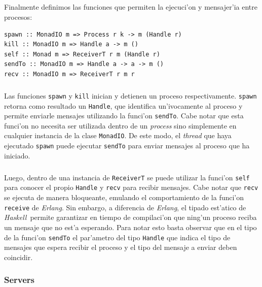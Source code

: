 \documentclass[a4paper]{article}
\newcommand{\haskell}{\textsl{Haskell}}
\begin{document}
\subparagraph{}Finalmente definimos las funciones que permiten la ejecuci'on y mensajer'ia entre procesos:
\begin{center}\begin{lstlisting}
spawn :: MonadIO m => Process r k -> m (Handle r)
kill :: MonadIO m => Handle a -> m ()
self :: Monad m => ReceiverT r m (Handle r)
sendTo :: MonadIO m => Handle a -> a -> m ()
recv :: MonadIO m => ReceiverT r m r
\end{lstlisting}\end{center}
\subparagraph{}Las funciones \texttt{spawn} y \texttt{kill} inician y detienen un proceso respectivamente.  \texttt{spawn} retorna como resultado un \texttt{Handle}, que identifica un'ivocamente al proceso y permite enviarle mensajes utilizando la funci'on \texttt{sendTo}.  Cabe notar que esta funci'on no necesita ser utilizada dentro de un \textsl{process} sino simplemente en cualquier instancia de la clase \texttt{MonadIO}.  De este modo, el \textsl{thread} que haya ejecutado \texttt{spawn} puede ejecutar \texttt{sendTo} para enviar mensajes al proceso que ha iniciado.
\subparagraph{}Luego, dentro de una instancia de \texttt{ReceiverT} se puede utilizar la funci'on \texttt{self} para conocer el propio \texttt{Handle} y \texttt{recv} para recibir mensajes.  Cabe notar que \texttt{recv} se ejecuta de manera bloqueante, emulando el comportamiento de la funci'on \texttt{receive} de \textsl{Erlang}.  Sin embargo, a diferencia de \textsl{Erlang}, el tipado est'atico de \haskell\ permite garantizar en tiempo de compilaci'on que ning'un proceso reciba un mensaje que no est'a esperando.   Para notar esto basta observar que en el tipo de la funci'on \texttt{sendTo} el par'ametro del tipo \texttt{Handle} que indica el tipo de mensajes que espera recibir el proceso y el tipo del mensaje a enviar deben coincidir.

\newpage
\subsubsection{Servers}
\end{document}
